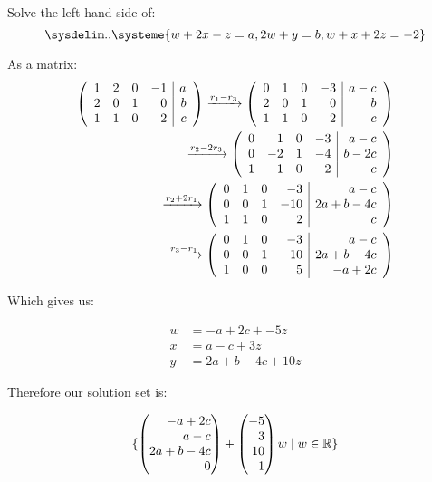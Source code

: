 \documentclass[12pt]{article}
\newenvironment{abc}{\begin{enumerate}[label={\bf(\alph*)}]}{\end{enumerate}}
\newcommand\m[2][]{
	\ifthenelse{\equal {#1} {}}
		{\begin{pmatrix*}[r]#2\end{pmatrix*}}
		{\left(\begin{array}{#1}#2\end{array}\right)}
}
\newcommand\resetequation[1][1]{\setcounter{equation}{#1 - 1}}
\begin{document}
\begin{abc}
\resetequation
\begin{item}
	Solve the left-hand side of:
	\begin{equation}
		\sysdelim..\systeme{w + 2x - z = a, 2w + y = b, w + x + 2z = -2}
	\end{equation}

	As a matrix:
	\begin{equation}
	\begin{aligned}
		\m[rrrr|r]{
			1 & 2 & 0 & -1 & a \\
			2 & 0 & 1 & 0 & b \\
			1 & 1 & 0 & 2 & c
		}
		\xrightarrow{r_1 - r_3}
		\m[rrrr|r]{
			0 & 1 & 0 & -3 & a - c \\
			2 & 0 & 1 & 0 & b \\
			1 & 1 & 0 & 2 & c
		}
		\\
		\xrightarrow{r_2 - 2r_3}
		\m[rrrr|r]{
			0 & 1 & 0 & -3 & a - c \\
			0 & -2 & 1 & -4 & b - 2c \\
			1 & 1 & 0 & 2 & c
		}
		\\
		\xrightarrow{r_2 + 2r_1}
		\m[rrrr|r]{
			0 & 1 & 0 & -3 & a - c \\
			0 & 0 & 1 & -10 & 2a + b - 4c \\
			1 & 1 & 0 & 2 & c
		}
		\\
		\xrightarrow{r_3 - r_1}
		\m[rrrr|r]{
			0 & 1 & 0 & -3 & a - c \\
			0 & 0 & 1 & -10 & 2a + b - 4c \\
			1 & 0 & 0 & 5 & -a + 2c
		}
	\end{aligned}
	\end{equation}

	Which gives us:

	\begin{equation}
	\begin{aligned}
		w &= - a + 2c + -5z \\ %
		x &= a - c + 3z \\     %
		y &= 2a + b - 4c + 10z   %
	\end{aligned}
	\end{equation}

	Therefore our solution set is:

	\begin{equation}
	\begin{aligned}
		\{ \m{-a + 2c \\ a - c \\ 2a + b - 4c \\ 0} + \m{-5 \\ 3 \\ 10 \\ 1}w \mid w \in \mathbb{R} \}
	\end{aligned}
	\end{equation}


\end{item}
\end{abc}
\end{document}
